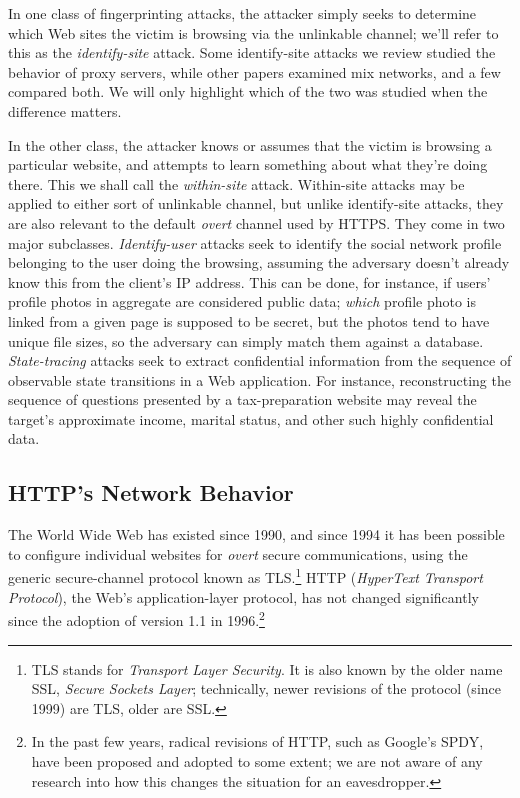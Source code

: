 \documentclass{zarticle}
\begin{document}
In one class of fingerprinting attacks, the attacker simply seeks to
determine which Web sites the victim is browsing via the unlinkable
channel; we'll refer to this as the \emph{identify-site} attack.  Some
identify-site attacks we review studied the behavior of proxy servers,
while other papers examined mix networks, and a few compared both.  We
will only highlight which of the two was studied when the difference
matters.

In the other class, the attacker knows or assumes that the victim is
browsing a particular website, and attempts to learn something about
what they're doing there.  This we shall call the \emph{within-site}
attack.  Within-site attacks may be applied to either sort of
unlinkable channel, but unlike identify-site attacks, they are also
relevant to the default \emph{overt} channel used by HTTPS.  They come
in two major subclasses.  \emph{Identify-user} attacks seek to
identify the social network profile belonging to the user doing the
browsing, assuming the adversary doesn't already know this from the
client's IP address.  This can be done, for instance, if users'
profile photos in aggregate are considered public data; \emph{which}
profile photo is linked from a given page is supposed to be secret,
but the photos tend to have unique file sizes, so the adversary can
simply match them against a
database.~\cite{herrmann2012analyzing,pironti2012identifying}
\emph{State-tracing} attacks seek to extract confidential information
from the sequence of observable state transitions in a Web
application.  For instance, reconstructing the sequence of questions
presented by a tax-preparation website may reveal the target's
approximate income, marital status, and other such highly confidential
data.~\cite{zhang2010sidebuster}

\subsection{HTTP's Network Behavior}

The World Wide Web has existed since 1990, and since 1994 it has been
possible to configure individual websites for \emph{overt} secure
communications, using the generic secure-channel protocol known as
TLS.\footnote{TLS stands for \emph{Transport Layer Security}. It is
  also known by the older name SSL, \emph{Secure Sockets Layer};
  technically, newer revisions of the protocol (since 1999) are TLS,
  older are SSL.}  HTTP (\emph{HyperText Transport Protocol}), the
Web's application-layer protocol, has not changed significantly since
the adoption of version 1.1 in 1996.\footnote{In the past few years,
  radical revisions of HTTP, such as Google's SPDY, have been proposed
  and adopted to some extent; we are not aware of any research into
  how this changes the situation for an eavesdropper.}
\end{document}
